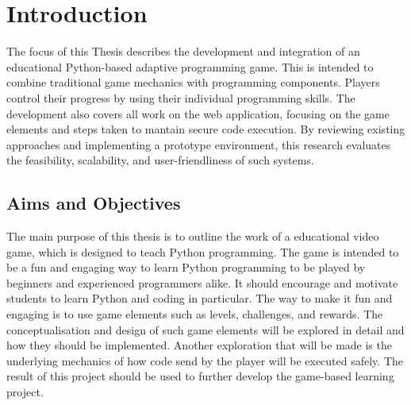 \section{Introduction}
The focus of this Thesis describes the development and integration of an educational Python-based adaptive programming game. This is intended to combine traditional game mechanics with programming components. Players control their progress by using their individual programming skills. The development also covers all work on the web application, focusing on the game elements and steps taken to mantain secure code execution. By reviewing existing approaches and implementing a prototype environment, this research evaluates the feasibility, scalability, and user-friendliness of such systems.

\subsection{Aims and Objectives} 
The main purpose of this thesis is to outline the work of a educational video game, which is designed to teach Python programming. The game is intended to be a fun and engaging way to learn Python programming to be played by beginners and experienced programmers alike.  It should encourage and motivate students to learn Python and coding in particular. The way to make it fun and engaging is to use game elements such as levels, challenges, and rewards. The conceptualisation and design of such game elements will be explored in detail and how they should be implemented. Another exploration that will be made is the underlying mechanics of how code send by the player will be executed safely. The result of this project should be used to further develop the game-based learning project. 